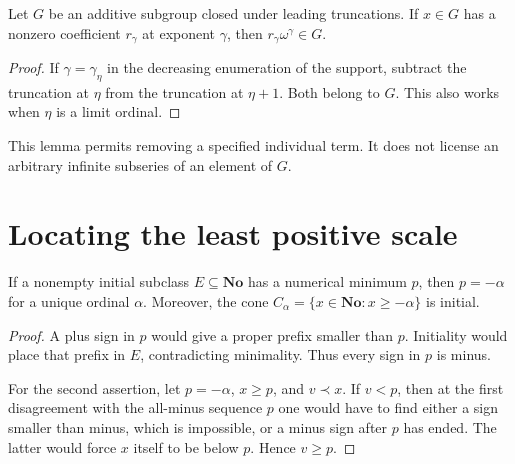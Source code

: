 \documentclass[11pt]{article}
\theoremstyle{definition}
\theoremstyle{remark}
\newcommand{\No}{\ensuremath{\mathbf{No}}}
\newcommand{\pr}{\mathrel{\prec}}
\begin{document}
\begin{lemma}\label{isg:lem:isolate}
Let $G$ be an additive subgroup closed under leading truncations. If
$x\in G$ has a nonzero coefficient $r_\gamma$ at exponent $\gamma$,
then $r_\gamma\omega^\gamma\in G$.
\end{lemma}
\begin{proof}
If $\gamma=\gamma_\eta$ in the decreasing enumeration of the support,
subtract the truncation at $\eta$ from the truncation at $\eta+1$.
Both belong to $G$. This also works when $\eta$ is a limit ordinal.
\end{proof}

This lemma permits removing a specified individual term. It does not
license an arbitrary infinite subseries of an element of $G$.

\section{Locating the least positive scale}\label{isg:sec:bottom}

\begin{lemma}\label{isg:lem:min-tree}
If a nonempty initial subclass $E\subseteq\No$ has a numerical minimum
$p$, then $p=-\alpha$ for a unique ordinal $\alpha$.
Moreover, the cone $C_\alpha=\{x\in\No:x\ge-\alpha\}$ is initial.
\end{lemma}
\begin{proof}
A plus sign in $p$ would give a proper prefix smaller than $p$.
Initiality would place that prefix in $E$, contradicting minimality.
Thus every sign in $p$ is minus.

For the second assertion, let $p=-\alpha$, $x\ge p$, and $v\pr x$.
If $v<p$, then at the first disagreement with the all-minus sequence $p$
one would have to find either a sign smaller than minus, which is
impossible, or a minus sign after $p$ has ended. The latter would force
$x$ itself to be below $p$. Hence $v\ge p$.
\end{proof}
\end{document}
